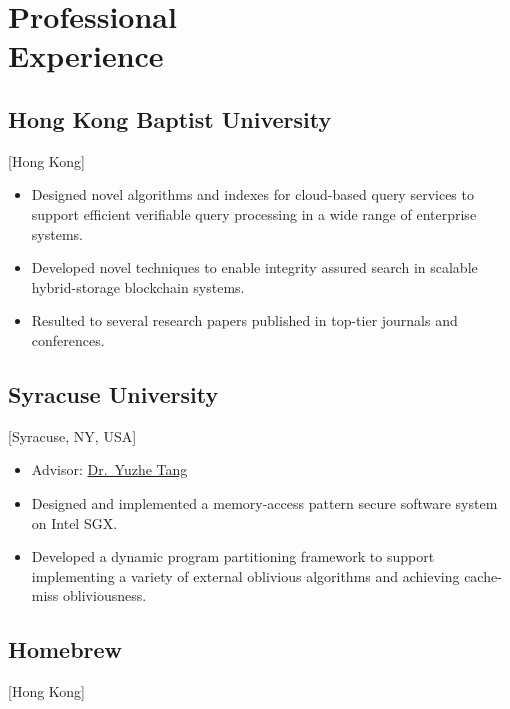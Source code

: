 \documentclass{mycv}
\begin{document}
\section{Professional \\ Experience}

\subsection{Hong Kong Baptist University}[Hong Kong]
\begin{positions}
\end{positions}

\begin{itemize}
  \item Designed novel algorithms and indexes for cloud-based query services to support efficient verifiable query processing in a wide range of enterprise systems.
  \item Developed novel techniques to enable integrity assured search in scalable hybrid-storage blockchain systems.
  \item Resulted to several research papers published in top-tier journals and conferences.
\end{itemize}

\subsection{Syracuse University}[Syracuse, NY, USA]
\begin{positions}
\end{positions}

\begin{itemize}
  \item Advisor: \href{http://tristartom.github.io}{Dr.~Yuzhe Tang}
  \item Designed and implemented a memory-access pattern secure software system on Intel SGX\@.
  \item Developed a dynamic program partitioning framework to support implementing a variety of external oblivious algorithms and achieving cache-miss obliviousness.
\end{itemize}

\subsection{Homebrew}[Hong Kong]
\begin{positions}
\end{positions}
\end{document}
